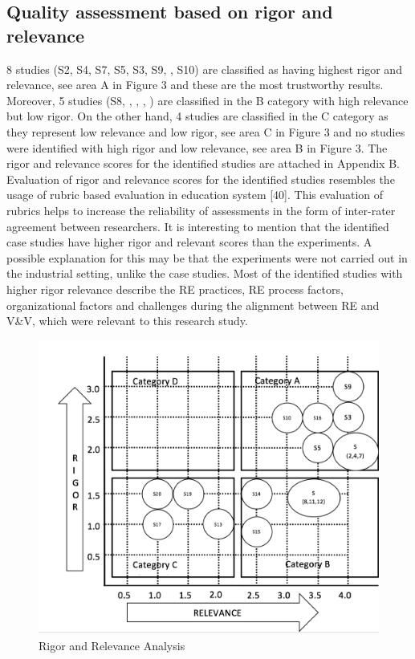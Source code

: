 \documentclass{article}
\begin{document}
\subsection{Quality assessment based on rigor and relevance}\label{RigorAndRelevance}

8 studies (S2, S4, S7, S5, S3, S9, \cite{bjarnason2014alignment}, S10) are classified as having highest rigor and relevance, see area A in Figure 3 and these are the most trustworthy results. Moreover, 5 studies (S8, \cite{metsa2007testing}, \cite{lobo2005local}, \cite{bjarnason2015industrial}, \cite{ferguson2006empirical}) are classified in the B category with high relevance but low rigor. On the other hand, 4 studies are classified in the C category as they represent low relevance and low rigor, see area C in Figure 3 and no studies were identified with high rigor and low relevance, see area B in Figure 3. The rigor and relevance scores for the identified studies are attached in Appendix B. 
Evaluation of rigor and relevance scores for the identified studies resembles the usage of rubric based evaluation in education system [40]. This evaluation of rubrics helps to increase the reliability of assessments in the form of inter-rater agreement between researchers. 
It is interesting to mention that the identified case studies have higher rigor and relevant scores than the experiments. A possible explanation for this may be that the experiments were not carried out in the industrial setting, unlike the case studies. Most of the identified studies with higher rigor relevance describe the RE practices, RE process factors, organizational factors and challenges during the alignment between RE and V&V, which were relevant to this research study. 

\begin{figure}
    \centering
    \includegraphics[width=\textwidth]{RigorAndRelevance.png}
    \caption{Rigor and Relevance Analysis}
    \label{fig:my_label}
\end{figure}
\end{document}

